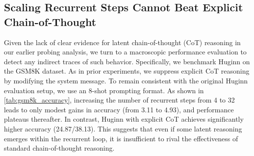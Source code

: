 \documentclass{article} %
\begin{document}
\begin{minipage}[c]{0.48\textwidth}
\vspace{-5pt}
    \begin{table}[H]  %
        \centering
        \caption{GSM8K accuracy (strict/flexible) across different models and recurrence steps. Without explicit CoT, there is a monotonic increase in accuracy as recurrent steps increases from 4 to 32. However, it is still substantially lower than that with explicit CoT as shown in the first row of the table.}
        \label{tab:gsm8k_accuracy}
    \end{table}
\end{minipage}


\subsection{Scaling Recurrent Steps Cannot Beat Explicit Chain-of-Thought}\label{sec:gsm8k}
Given the lack of clear evidence for latent chain-of-thought (CoT) reasoning in our earlier probing analysis, we turn to a macroscopic performance evaluation to detect any indirect traces of such behavior. Specifically, we benchmark Huginn on the GSM8K dataset. As in prior experiments, we suppress explicit CoT reasoning by modifying the system message. To remain consistent with the original Huginn evaluation setup, we use an 8-shot prompting format. As shown in \cref{tab:gsm8k_accuracy}, increasing the number of recurrent steps from 4 to 32 leads to only modest gains in accuracy (from 3.11 to 4.93), and performance plateaus thereafter. In contrast, Huginn with explicit CoT achieves significantly higher accuracy (24.87/38.13). This suggests that even if some latent reasoning emerges within the recurrent loop, it is insufficient to rival the effectiveness of standard chain-of-thought reasoning.
\vspace{-5pt}
\end{document}
